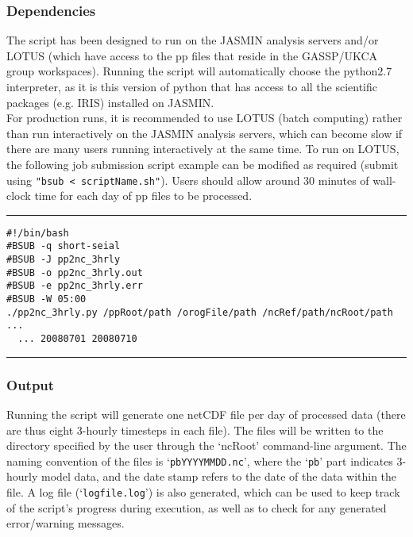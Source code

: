 \documentclass[10pt,a4paper]{article}
\begin{document}
\subsubsection{Dependencies}
The script has been designed to run on the JASMIN analysis servers and/or LOTUS (which have access to the pp files that reside in the GASSP/UKCA group workspaces). Running the script will automatically choose the python2.7 interpreter, as it is this version of python that has access to all the scientific packages (e.g. IRIS) installed on JASMIN.\\
For production runs, it is recommended to use LOTUS (batch computing) rather than run interactively on the JASMIN analysis servers, which can become slow if there are many users running interactively at the same time. To run on LOTUS, the following job submission script example can be modified as required (submit using \texttt{"bsub < scriptName.sh"}). Users should allow around 30 minutes of wall-clock time for each day of pp files to be processed.\\
\hrule
\begin{spacing}{1}
\begin{lstlisting}
#!/bin/bash
#BSUB -q short-seial
#BSUB -J pp2nc_3hrly
#BSUB -o pp2nc_3hrly.out 
#BSUB -e pp2nc_3hrly.err 
#BSUB -W 05:00
./pp2nc_3hrly.py /ppRoot/path /orogFile/path /ncRef/path/ncRoot/path ...
  ... 20080701 20080710
\end{lstlisting}
\end{spacing}
\hrule

\subsubsection{Output}
Running the script will generate one netCDF file per day of processed data (there are thus eight 3-hourly timesteps in each file). The files will be written to the directory specified by the user through the `ncRoot' command-line argument. The naming convention of the files is `\texttt{pbYYYYMMDD.nc}', where the `\texttt{pb}' part indicates 3-hourly model data, and the date stamp refers to the date of the data within the file. A log file (`\texttt{logfile.log}') is also generated, which can be used to keep track of the script's progress during execution, as well as to check for any generated error/warning messages.
\end{document}
